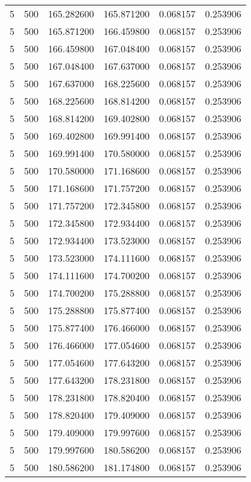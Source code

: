 \begin{longtable}{rrrrrr}
5 & 500 & 165.282600 & 165.871200 & 0.068157 & 0.253906 \\
5 & 500 & 165.871200 & 166.459800 & 0.068157 & 0.253906 \\
5 & 500 & 166.459800 & 167.048400 & 0.068157 & 0.253906 \\
5 & 500 & 167.048400 & 167.637000 & 0.068157 & 0.253906 \\
5 & 500 & 167.637000 & 168.225600 & 0.068157 & 0.253906 \\
5 & 500 & 168.225600 & 168.814200 & 0.068157 & 0.253906 \\
5 & 500 & 168.814200 & 169.402800 & 0.068157 & 0.253906 \\
5 & 500 & 169.402800 & 169.991400 & 0.068157 & 0.253906 \\
5 & 500 & 169.991400 & 170.580000 & 0.068157 & 0.253906 \\
5 & 500 & 170.580000 & 171.168600 & 0.068157 & 0.253906 \\
5 & 500 & 171.168600 & 171.757200 & 0.068157 & 0.253906 \\
5 & 500 & 171.757200 & 172.345800 & 0.068157 & 0.253906 \\
5 & 500 & 172.345800 & 172.934400 & 0.068157 & 0.253906 \\
5 & 500 & 172.934400 & 173.523000 & 0.068157 & 0.253906 \\
5 & 500 & 173.523000 & 174.111600 & 0.068157 & 0.253906 \\
5 & 500 & 174.111600 & 174.700200 & 0.068157 & 0.253906 \\
5 & 500 & 174.700200 & 175.288800 & 0.068157 & 0.253906 \\
5 & 500 & 175.288800 & 175.877400 & 0.068157 & 0.253906 \\
5 & 500 & 175.877400 & 176.466000 & 0.068157 & 0.253906 \\
5 & 500 & 176.466000 & 177.054600 & 0.068157 & 0.253906 \\
5 & 500 & 177.054600 & 177.643200 & 0.068157 & 0.253906 \\
5 & 500 & 177.643200 & 178.231800 & 0.068157 & 0.253906 \\
5 & 500 & 178.231800 & 178.820400 & 0.068157 & 0.253906 \\
5 & 500 & 178.820400 & 179.409000 & 0.068157 & 0.253906 \\
5 & 500 & 179.409000 & 179.997600 & 0.068157 & 0.253906 \\
5 & 500 & 179.997600 & 180.586200 & 0.068157 & 0.253906 \\
5 & 500 & 180.586200 & 181.174800 & 0.068157 & 0.253906 \\

\end{longtable}
